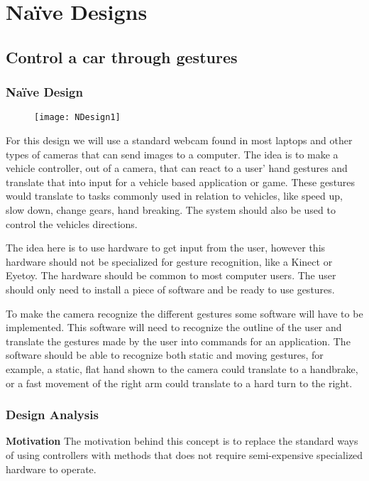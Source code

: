 \appendix
\appendixpage
\addappheadtotoc

\section{Naïve Designs} \label{NaiveDesigns}

\subsection{Control a car through gestures} \label{nd1}
\subsubsection*{Naïve Design}

\begin{figure}[h]
\centering
\texttt{[image: NDesign1]}
\caption{}
\label{fig:ndesign1}
\end{figure}

For this design we will use a standard webcam found in most laptops and other types of cameras that can send images to a computer. The idea is to make a vehicle controller, out of a camera, that can react to a user’ hand gestures and translate that into input for a vehicle based application or game. These gestures would translate to tasks commonly used in relation to vehicles, like speed up, slow down, change gears, hand breaking. The system should also be used to control the vehicles directions.


The idea here is to use hardware to get input from the user, however this hardware should not be specialized for gesture recognition, like a Kinect or Eyetoy. The hardware should be common to most computer users. The user should only need to install a piece of software and be ready to use gestures.


To make the camera recognize the different gestures some software will have to be implemented. This software will need to recognize the outline of the user and translate the gestures made by the user into commands for an application. The software should be able to recognize both static and moving gestures, for example, a static, flat hand shown to the camera could translate to a handbrake, or a fast movement of the right arm could translate to a hard turn to the right.

\subsubsection*{Design Analysis}
\noindent\textbf{Motivation} \newline
The motivation behind this concept is to replace the standard ways of using controllers with methods that does not require semi-expensive specialized hardware to operate.

